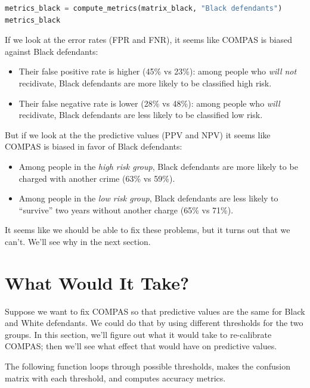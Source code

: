 \begin{lstlisting}[language=Python,style=source]
metrics_black = compute_metrics(matrix_black, "Black defendants")
metrics_black
\end{lstlisting}

If we look at the error rates (FPR and FNR), it seems like COMPAS is
biased against Black defendants:

\begin{itemize}
\item
  Their false positive rate is higher (45\% vs 23\%): among people who
  \emph{will not} recidivate, Black defendants are more likely to be
  classified high risk.
\item
  Their false negative rate is lower (28\% vs 48\%): among people who
  \emph{will} recidivate, Black defendants are less likely to be
  classified low risk.
\end{itemize}

But if we look at the the predictive values (PPV and NPV) it seems like
COMPAS is biased in favor of Black defendants:

\begin{itemize}
\item
  Among people in the \emph{high risk group}, Black defendants are more
  likely to be charged with another crime (63\% vs 59\%).
\item
  Among people in the \emph{low risk group}, Black defendants are less
  likely to ``survive'' two years without another charge (65\% vs 71\%).
\end{itemize}

It seems like we should be able to fix these problems, but it turns out
that we can't. We'll see why in the next section.

\hypertarget{what-would-it-take}{%
\section{What Would It Take?}\label{what-would-it-take}}

Suppose we want to fix COMPAS so that predictive values are the same for
Black and White defendants. We could do that by using different
thresholds for the two groups. In this section, we'll figure out what it
would take to re-calibrate COMPAS; then we'll see what effect that would
have on predictive values.

The following function loops through possible thresholds, makes the
confusion matrix with each threshold, and computes accuracy metrics.


